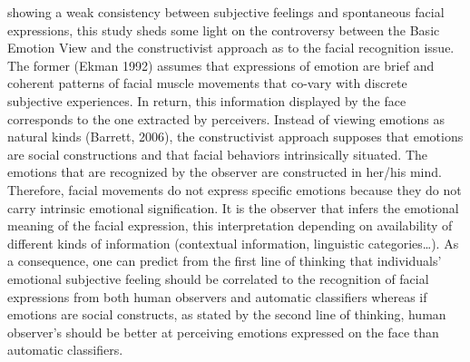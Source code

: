 \documentclass[man]{apa6}
\begin{document}
showing a weak consistency between subjective feelings and spontaneous facial expressions, this study sheds some light on the controversy between the Basic Emotion View and the constructivist approach as to the facial recognition issue. The former (Ekman 1992) assumes that expressions of emotion are brief and coherent patterns of facial muscle movements that co-vary with discrete subjective experiences. In return, this information displayed by the face corresponds to the one extracted by perceivers. Instead of viewing emotions as natural kinds (Barrett, 2006), the constructivist approach supposes that emotions are social constructions and that facial behaviors intrinsically situated. The emotions that are recognized by the observer are constructed in her/his mind. Therefore, facial movements do not express specific emotions because they do not carry intrinsic emotional signification. It is the observer that infers the emotional meaning of the facial expression, this interpretation depending on availability of different kinds of information (contextual information, linguistic categories\ldots{}). As a consequence, one can predict from the first line of thinking that individuals' emotional subjective feeling should be correlated to the recognition of facial expressions from both human observers and automatic classifiers whereas if emotions are social constructs, as stated by the second line of thinking, human observer's should be better at perceiving emotions expressed on the face than automatic classifiers.
\end{document}

